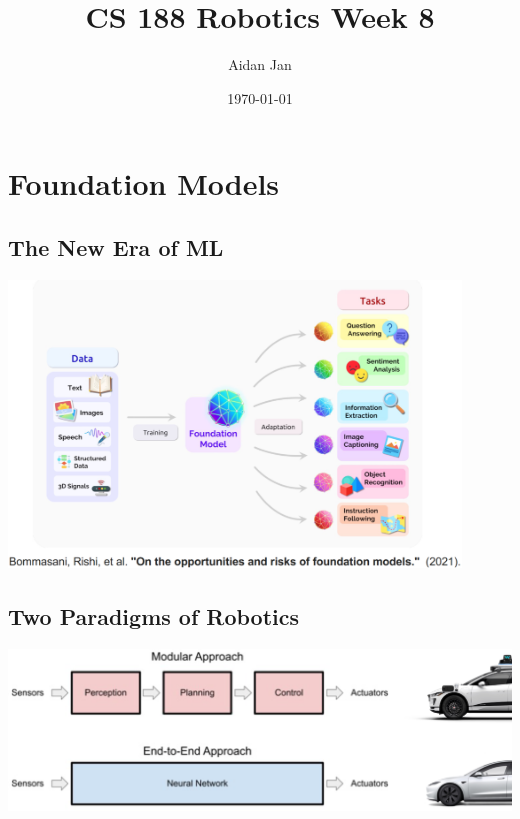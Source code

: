\documentclass[10pt]{article}
\title{CS 188 Robotics Week 8}
\author{Aidan Jan}
\date{\today}
\begin{document}
\maketitle 

\section*{Foundation Models}

\subsection*{The New Era of ML}
\begin{center} 
	\includegraphics*[width=0.9\textwidth]{L1_1.png} 
\end{center}

\subsection*{Two Paradigms of Robotics}
\begin{center} 
	\includegraphics*[width=\textwidth]{L1_2.png} 
\end{center}
\end{document}
